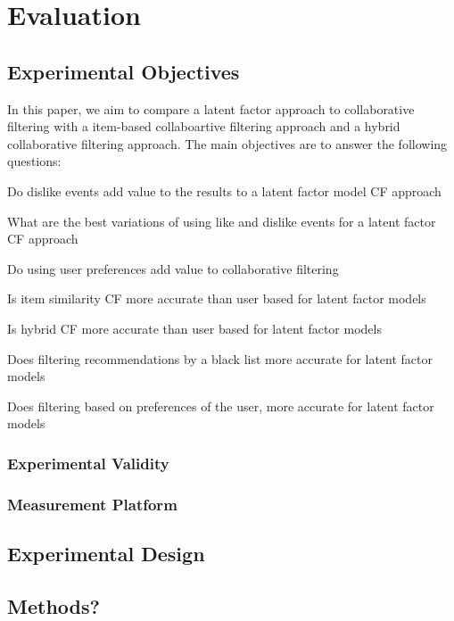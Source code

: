 \chapter{Evaluation}\label{C:evaluation}

\section{Experimental Objectives}
In this paper, we aim to compare a latent factor approach to collaborative filtering with a item-based collaboartive filtering approach and a hybrid collaborative filtering approach. The main objectives are to answer the following questions:
\begin{objectives}
	\item{Do dislike events add value to the results to a latent factor model CF approach}
	\item{What are the best variations of using like and dislike events for a latent factor CF approach}
	\item{Do using user preferences add value to collaborative filtering}
	\item{Is item similarity CF more accurate than user based for latent factor models}
	\item{Is hybrid CF more accurate than user based for latent factor models}
	\item{Does filtering recommendations by a black list more accurate for latent factor models}
	\item{Does filtering based on preferences of the user, more accurate for latent factor models}
\end{objectives}

\subsection{Experimental Validity}

\subsection{Measurement Platform}

\section{Experimental Design}


\section{Methods?}

